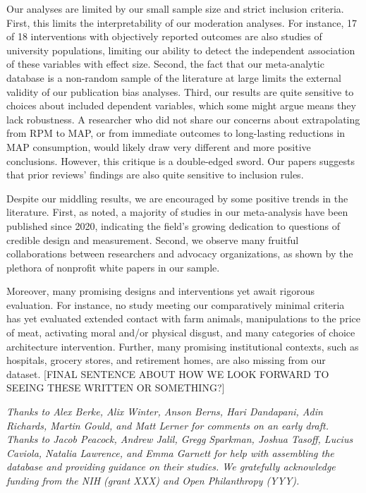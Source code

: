 \documentclass[sn-nature,referee,pdflatex]{sn-jnl}
\begin{document}
Our analyses are limited by our small sample size and strict inclusion
criteria. First, this limits the interpretability of our moderation
analyses. For instance, 17 of 18 interventions with objectively reported
outcomes are also studies of university populations, limiting our
ability to detect the independent association of these variables with
effect size. Second, the fact that our meta-analytic database is a
non-random sample of the literature at large limits the external
validity of our publication bias analyses. Third, our results are quite
sensitive to choices about included dependent variables, which some
might argue means they lack robustness. A researcher who did not share
our concerns about extrapolating from RPM to MAP, or from immediate
outcomes to long-lasting reductions in MAP consumption, would likely
draw very different and more positive conclusions. However, this
critique is a double-edged sword. Our papers suggests that prior
reviews' findings are also quite sensitive to inclusion rules.

Despite our middling results, we are encouraged by some positive trends
in the literature. First, as noted, a majority of studies in our
meta-analysis have been published since 2020, indicating the field's
growing dedication to questions of credible design and measurement.
Second, we observe many fruitful collaborations between researchers and
advocacy organizations, as shown by the plethora of nonprofit white
papers in our sample.

Moreover, many promising designs and interventions yet await rigorous
evaluation. For instance, no study meeting our comparatively minimal
criteria has yet evaluated extended contact with farm animals,
manipulations to the price of meat, activating moral and/or physical
disgust, and many categories of choice architecture intervention.
Further, many promising institutional contexts, such as hospitals,
grocery stores, and retirement homes, are also missing from our dataset.
{[}FINAL SENTENCE ABOUT HOW WE LOOK FORWARD TO SEEING THESE WRITTEN OR
SOMETHING?{]}


\emph{Thanks to Alex Berke, Alix Winter, Anson Berns, Hari Dandapani,
Adin Richards, Martin Gould, and Matt Lerner for comments on an early
draft. Thanks to Jacob Peacock, Andrew Jalil, Gregg Sparkman, Joshua
Tasoff, Lucius Caviola, Natalia Lawrence, and Emma Garnett for help with
assembling the database and providing guidance on their studies. We
gratefully acknowledge funding from the NIH (grant XXX) and Open
Philanthropy (YYY).}
\end{document}
